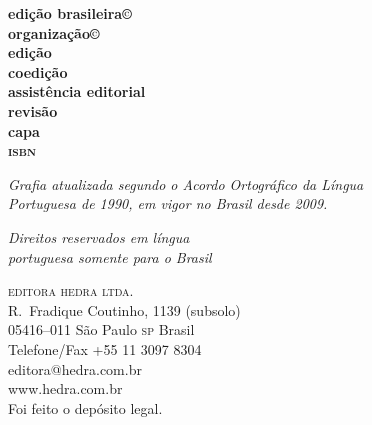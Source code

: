 \newcommand{\linha}[2]{\ifdef{#2}{\linhalayout{#1}{#2}}{}}

\begingroup\tiny
\parindent=0cm
\thispagestyle{empty}

\textbf{edição brasileira©}\\
\textbf{organização©}\\

\textbf{edição}\\
\textbf{coedição}\\
\textbf{assistência editorial}\\
\textbf{revisão}\\
\textbf{capa}\\

\textbf{\textsc{isbn}}


\bigskip
 
\textit{Grafia atualizada segundo o Acordo Ortográfico da Língua\\
Portuguesa de 1990, em vigor no Brasil desde 2009.}\\

\vfill

\textit{Direitos reservados em língua\\ 
portuguesa somente para o Brasil}\\\smallskip

\textsc{editora hedra ltda.}\\
R.~Fradique Coutinho, 1139 (subsolo)\\
05416--011 São Paulo \textsc{sp} Brasil\\
Telefone/Fax +55 11 3097 8304\\\smallskip
editora@hedra.com.br\\
www.hedra.com.br\\
\bigskip
Foi feito o depósito legal.

\endgroup
\pagebreak